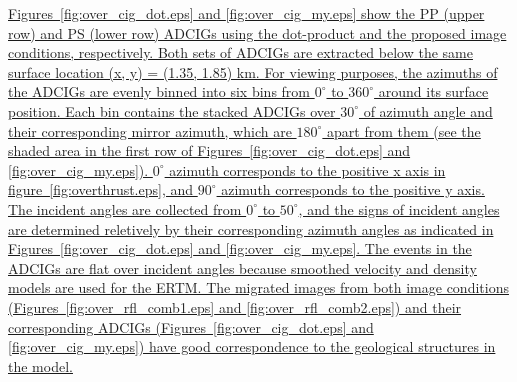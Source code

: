 \documentclass[manuscript,ulem,graphix,revised]{geophysics}
\begin{document}
\uline{Figures~\ref{fig:over_cig_dot.eps} and \marginpar{[4,6,13]} \ref{fig:over_cig_my.eps} show the PP (upper row) and PS (lower row) ADCIGs using the dot-product and the proposed image conditions, respectively.
 Both sets of ADCIGs are extracted below the same surface location (x, y) = (1.35, 1.85) km.  For viewing purposes, the azimuths of the ADCIGs are evenly binned into six bins from $\mathrm{0^\circ}$ to $\mathrm{360^\circ}$ around its surface position. 
Each bin contains the stacked ADCIGs over $\mathrm{30^\circ}$ of azimuth angle and their corresponding mirror azimuth, which are $\mathrm{180^\circ}$ apart from them (see the shaded area in the first row of Figures~\ref{fig:over_cig_dot.eps} and \marginpar{[4,6,13]} \ref{fig:over_cig_my.eps}). $\mathrm{0^\circ}$ azimuth corresponds to the positive x axis in figure~\ref{fig:overthrust.eps}, and $\mathrm{90^\circ}$ azimuth corresponds to the positive y axis.
The incident angles are collected from $\mathrm{0^\circ}$ to $\mathrm{50^\circ}$, and the signs of incident angles are determined reletively by their corresponding azimuth angles as indicated in Figures~\ref{fig:over_cig_dot.eps} and \ref{fig:over_cig_my.eps}. 
The events in the ADCIGs are flat over incident angles because smoothed velocity and density models are used for the ERTM. 
The migrated images from both image conditions (Figures~\ref{fig:over_rfl_comb1.eps} and \ref{fig:over_rfl_comb2.eps}) and their corresponding ADCIGs (Figures~\ref{fig:over_cig_dot.eps} and \ref{fig:over_cig_my.eps}) have good correspondence to the geological structures in the model. 
} 
\end{document}
